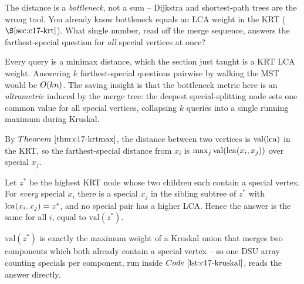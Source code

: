 \begin{attemptgate}
The distance is a \emph{bottleneck}, not a sum -- Dijkstra and shortest-path trees
are the wrong tool.  You already know bottleneck equals an LCA weight in the KRT
(\(\secref{c17-krt}\)).  What single number, read off the merge sequence, answers
the farthest-special question for \emph{all} special vertices at once?
\end{attemptgate}

Every query is a minimax distance, which the section just taught is a KRT LCA
weight.  Answering \(k\) farthest-special questions pairwise by walking the MST
would be \(O(k n)\).  The saving insight is that the bottleneck metric here is
an \emph{ultrametric} induced by the merge tree: the deepest special-splitting
node sets one common value for all special vertices, collapsing \(k\) queries into
a single running maximum during Kruskal.

\begin{observation}
By \(\thmref{c17-krtmax}\), the distance between two vertices is
\(\mathrm{val}(\operatorname{lca})\) in the KRT, so the farthest-special distance from \(x_i\) is
\(\max_j \mathrm{val}(\operatorname{lca}(x_i,x_j))\) over special \(x_j\).
\end{observation}
\begin{observation}
Let \(z^{*}\) be the highest KRT node whose two children each contain a special
vertex.  For \emph{every} special \(x_i\) there is a special \(x_j\) in the sibling
subtree of \(z^{*}\) with \(\operatorname{lca}(x_i,x_j)=z^{*}\), and no special pair has a higher
LCA.  Hence the answer is the same for all \(i\), equal to \(\mathrm{val}(z^{*})\).
\end{observation}
\begin{observation}
\(\mathrm{val}(z^{*})\) is exactly the maximum weight of a Kruskal union that
merges two components which both already contain a special vertex -- so one DSU
array counting specials per component, run inside \(\coderef{c17-kruskal}\), reads
the answer directly.
\end{observation}

